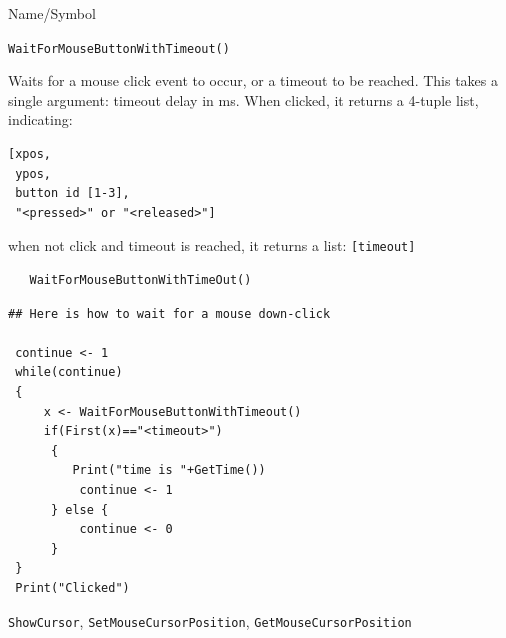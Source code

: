 \begin{desc}{Name/Symbol}
\item[Name/Symbol]	\verb+WaitForMouseButtonWithTimeout()+

\item[Description] Waits for a mouse click event to occur, or a
  timeout to be reached.
  This takes a single argument: timeout delay in ms. When clicked, it returns a
  4-tuple list, indicating:
\begin{verbatim}
[xpos,
 ypos, 
 button id [1-3], 
 "<pressed>" or "<released>"]
\end{verbatim}
  when not click and timeout is reached, it returns a list:
   \verb+[timeout]+

\item[Usage]

\begin{verbatim}
   WaitForMouseButtonWithTimeOut()
\end{verbatim}

\item[Example]	
\begin{verbatim}
## Here is how to wait for a mouse down-click

 continue <- 1
 while(continue)
 {
     x <- WaitForMouseButtonWithTimeout()
     if(First(x)=="<timeout>")
      {
         Print("time is "+GetTime())
          continue <- 1
      } else {
          continue <- 0
      }
 }
 Print("Clicked")
\end{verbatim}


\item[See Also]
  \verb+ShowCursor+,
  \verb+SetMouseCursorPosition+, \verb+GetMouseCursorPosition+
\end{desc}







